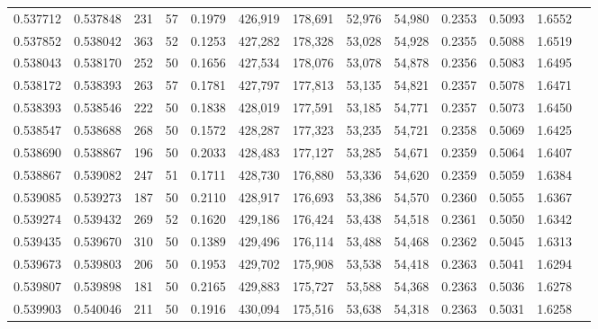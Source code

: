 \begin{tabular}{rrrrrrrrrrrrr}
0.537712 & 0.537848 &   231 &  57 &                                     0.1979 & 426,919 & 178,691 &  52,976 &  54,980 & 0.2353 & 0.5093 & 1.6552 \\
0.537852 & 0.538042 &   363 &  52 &                                     0.1253 & 427,282 & 178,328 &  53,028 &  54,928 & 0.2355 & 0.5088 & 1.6519 \\
0.538043 & 0.538170 &   252 &  50 &                                     0.1656 & 427,534 & 178,076 &  53,078 &  54,878 & 0.2356 & 0.5083 & 1.6495 \\
0.538172 & 0.538393 &   263 &  57 &                                     0.1781 & 427,797 & 177,813 &  53,135 &  54,821 & 0.2357 & 0.5078 & 1.6471 \\
0.538393 & 0.538546 &   222 &  50 &                                     0.1838 & 428,019 & 177,591 &  53,185 &  54,771 & 0.2357 & 0.5073 & 1.6450 \\
0.538547 & 0.538688 &   268 &  50 &                                     0.1572 & 428,287 & 177,323 &  53,235 &  54,721 & 0.2358 & 0.5069 & 1.6425 \\
0.538690 & 0.538867 &   196 &  50 &                                     0.2033 & 428,483 & 177,127 &  53,285 &  54,671 & 0.2359 & 0.5064 & 1.6407 \\
0.538867 & 0.539082 &   247 &  51 &                                     0.1711 & 428,730 & 176,880 &  53,336 &  54,620 & 0.2359 & 0.5059 & 1.6384 \\
0.539085 & 0.539273 &   187 &  50 &                                     0.2110 & 428,917 & 176,693 &  53,386 &  54,570 & 0.2360 & 0.5055 & 1.6367 \\
0.539274 & 0.539432 &   269 &  52 &                                     0.1620 & 429,186 & 176,424 &  53,438 &  54,518 & 0.2361 & 0.5050 & 1.6342 \\
0.539435 & 0.539670 &   310 &  50 &                                     0.1389 & 429,496 & 176,114 &  53,488 &  54,468 & 0.2362 & 0.5045 & 1.6313 \\
0.539673 & 0.539803 &   206 &  50 &                                     0.1953 & 429,702 & 175,908 &  53,538 &  54,418 & 0.2363 & 0.5041 & 1.6294 \\
0.539807 & 0.539898 &   181 &  50 &                                     0.2165 & 429,883 & 175,727 &  53,588 &  54,368 & 0.2363 & 0.5036 & 1.6278 \\
0.539903 & 0.540046 &   211 &  50 &                                     0.1916 & 430,094 & 175,516 &  53,638 &  54,318 & 0.2363 & 0.5031 & 1.6258 \\

\end{tabular}
